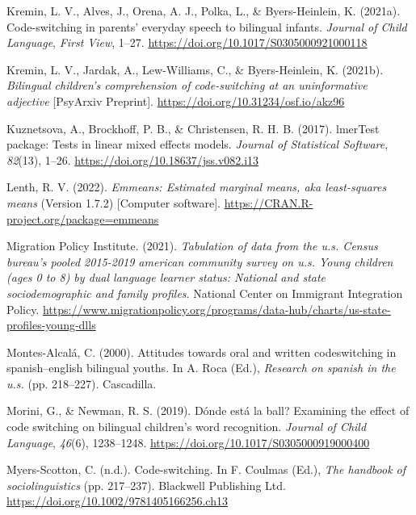 \documentclass[
  man,floatsintext]{apa7}
\newlength{\cslhangindent}
\newlength{\cslentryspacingunit} %
\newenvironment{CSLReferences}[2] %
 {%
  \setlength{\parindent}{0pt}
  \ifodd #1
  \let\oldpar\par
  \def\par{\hangindent=\cslhangindent\oldpar}
  \fi
  \setlength{\parskip}{#2\cslentryspacingunit}
 }%
 {}
\begin{document}
\begin{CSLReferences}{1}{0}
\leavevmode{}%
Kremin, L. V., Alves, J., Orena, A. J., Polka, L., \& Byers-Heinlein, K. (2021a). Code-switching in parents' everyday speech to bilingual infants. \emph{Journal of Child Language}, \emph{First View}, 1--27. \url{https://doi.org/10.1017/S0305000921000118}

\leavevmode{}%
Kremin, L. V., Jardak, A., Lew-Williams, C., \& Byers-Heinlein, K. (2021b). \emph{Bilingual children's comprehension of code-switching at an uninformative adjective} {[}PsyArxiv Preprint{]}. \url{https://doi.org/10.31234/osf.io/akz96}

\leavevmode{}%
Kuznetsova, A., Brockhoff, P. B., \& Christensen, R. H. B. (2017). lmerTest package: Tests in linear mixed effects models. \emph{Journal of Statistical Software}, \emph{82}(13), 1--26. \url{https://doi.org/10.18637/jss.v082.i13}

\leavevmode{}%
Lenth, R. V. (2022). \emph{Emmeans: Estimated marginal means, aka least-squares means} (Version 1.7.2) {[}Computer software{]}. \url{https://CRAN.R-project.org/package=emmeans}

\leavevmode{}%
Migration Policy Institute. (2021). \emph{Tabulation of data from the u.s. Census bureau's pooled 2015-2019 american community survey on u.s. Young children (ages 0 to 8) by dual language learner status: National and state sociodemographic and family profiles}. National Center on Immigrant Integration Policy. \url{https://www.migrationpolicy.org/programs/data-hub/charts/us-state-profiles-young-dlls}

\leavevmode{}%
Montes-Alcalá, C. (2000). Attitudes towards oral and written codeswitching in spanish--english bilingual youths. In A. Roca (Ed.), \emph{Research on spanish in the u.s.} (pp. 218--227). Cascadilla.

\leavevmode{}%
Morini, G., \& Newman, R. S. (2019). Dónde está la ball? Examining the effect of code switching on bilingual children's word recognition. \emph{Journal of Child Language}, \emph{46}(6), 1238--1248. \url{https://doi.org/10.1017/S0305000919000400}

\leavevmode{}%
Myers-Scotton, C. (n.d.). Code-switching. In F. Coulmas (Ed.), \emph{The handbook of sociolinguistics} (pp. 217--237). Blackwell Publishing Ltd. \url{https://doi.org/10.1002/9781405166256.ch13}


\end{CSLReferences}
\end{document}
